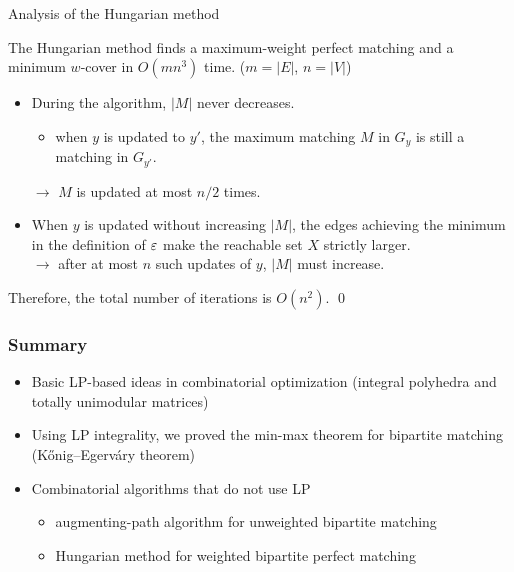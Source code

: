 \documentclass[14pt,aspectratio=169,xcolor=dvipsnames,table,onlytextwidth]{beamer}
\begin{document}
\begin{frame}{Analysis of the Hungarian method}

    \small
    \begin{theorem}
        The Hungarian method finds a maximum-weight perfect matching and a minimum $w$-cover in $O(mn^3)$ time.
        \hfill {\footnotesize ($m = |E|$, $n = |V|$)}
    \end{theorem}

    \pause
    \begin{itemize}[<+->]
        \item During the algorithm, $|M|$ never decreases.
        \begin{itemize}
            \item[($\because$)] when $y$ is updated to $y'$, the maximum matching $M$ in $G_y$ is still a matching in $G_{y'}$.
        \end{itemize}
        $\longrightarrow$ $M$ is updated at most $n/2$ times.

        \item When $y$ is updated without increasing $|M|$, the edges achieving the minimum in the definition of $\varepsilon$ make the reachable set $X$ strictly larger.\\
        $\longrightarrow$ after at most $n$ such updates of $y$, $|M|$ must increase.
    \end{itemize}

    \vfill
    \onslide<+->
    Therefore, the total number of iterations is $O(n^2)$. \qed
\end{frame}

\begin{frame}
    \frametitle{Summary}

    \begin{itemize}
        \setlength{\itemsep}{1em}
        \item Basic LP-based ideas in combinatorial optimization (integral polyhedra and totally unimodular matrices)

        \item Using LP integrality, we proved the min-max theorem for bipartite matching (K\H{o}nig--Egerv\'ary theorem)

        \item Combinatorial algorithms that do not use LP
        \begin{itemize}
            \item augmenting-path algorithm for unweighted bipartite matching
            \item Hungarian method for weighted bipartite perfect matching
        \end{itemize}
    \end{itemize}

\end{frame}
\end{document}

